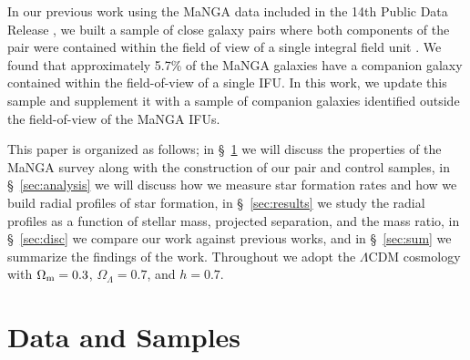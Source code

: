 \documentclass[iop,revtex4,twocolumn,apj,numberedappendix,appendixfloats]{emulateapj}
\begin{document}
In our previous work using the MaNGA data included in the 14th Public Data Release \citep[DR14;][]{Abolfathi:2018}, we built a sample of close galaxy pairs where both components of the pair were contained within the field of view of a single integral field unit \citep[][hereafter ]{Fu:2018}. We found that approximately 5.7\% of the MaNGA galaxies have a companion galaxy contained within the field-of-view of a single IFU. In this work, we update this sample and supplement it with a sample of companion galaxies identified outside the field-of-view of the MaNGA IFUs. 

This paper is organized as follows; in \S~\ref{sec:data} we will discuss the properties of the MaNGA survey along with the construction of our pair and control samples, in \S~\ref{sec:analysis} we will discuss how we measure star formation rates and how we build radial profiles of star formation, in \S~\ref{sec:results} we study the radial profiles as a function of stellar mass, projected separation, and the mass ratio, in \S~\ref{sec:disc} we compare our work against previous works, and in \S~\ref{sec:sum} we summarize the findings of the work. 
Throughout we adopt the $\Lambda$CDM cosmology with $\Omega_{\rm m}=0.3$, $\Omega_\Lambda=0.7$, and $h=0.7$. 

\section{Data and Samples}\label{sec:data}
\end{document}
